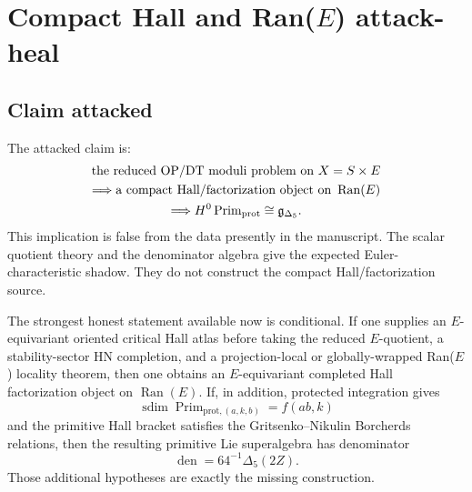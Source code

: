\section{Compact Hall and Ran(\(E\)) attack-heal}
\label{sec:compact-hall-ranE-attack-heal}

\providecommand{\Z}{\mathbb Z}
\providecommand{\C}{\mathbb C}
\providecommand{\Ran}{\operatorname{Ran}}
\providecommand{\Supp}{\operatorname{Supp}}
\providecommand{\Coh}{\operatorname{Coh}}
\providecommand{\Perf}{\operatorname{Perf}}
\providecommand{\Hilb}{\operatorname{Hilb}}
\providecommand{\Ext}{\operatorname{Ext}}
\providecommand{\RHom}{\operatorname{RHom}}
\providecommand{\BM}{\operatorname{BM}}
\providecommand{\Prim}{\operatorname{Prim}}
\providecommand{\sdim}{\operatorname{sdim}}
\providecommand{\smult}{\operatorname{smult}}
\providecommand{\Hall}{\mathcal H}
\providecommand{\Fact}{\mathsf{Fact}}
\providecommand{\Den}{\mathsf{Den}}
\providecommand{\Spch}{\mathrm{Sp}^{\mathrm{ch}}}
\providecommand{\hCS}{\mathrm{hCS}}
\providecommand{\van}{\varphi}

\subsection{Claim attacked}

The attacked claim is:
\[
\begin{gathered}
\hbox{the reduced OP/DT moduli problem on }X=S\times E\\
\Longrightarrow
\hbox{a compact Hall/factorization object on }\Ran(E)\\
\Longrightarrow
H^0\Prim_{\mathrm{prot}}\cong \mathfrak g_{\Delta_5}.
\end{gathered}
\]
This implication is false from the data presently in the manuscript.
The scalar quotient theory and the denominator algebra give the expected
Euler-characteristic shadow.  They do not construct the compact
Hall/factorization source.

The strongest honest statement available now is conditional.  If one
supplies an \(E\)-equivariant oriented critical Hall atlas before taking
the reduced \(E\)-quotient, a stability-sector HN completion, and a
projection-local or globally-wrapped Ran(\(E\)) locality theorem, then
one obtains an \(E\)-equivariant completed Hall factorization object on
\(\Ran(E)\).  If, in addition, protected integration gives
\[
\sdim\Prim_{\mathrm{prot},(a,k,b)}=f(ab,k)
\]
and the primitive Hall bracket satisfies the Gritsenko--Nikulin
Borcherds relations, then the resulting primitive Lie superalgebra has
denominator
\[
\operatorname{den}=64^{-1}\Delta_5(2Z).
\]
Those additional hypotheses are exactly the missing construction.


